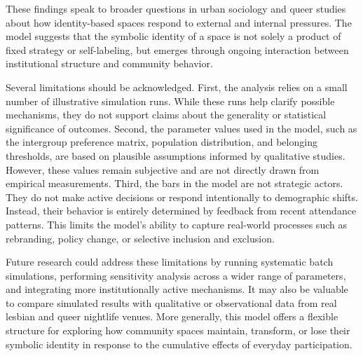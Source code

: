 \documentclass{article}
\begin{document}
These findings speak to broader questions in urban sociology and queer studies about how identity-based spaces respond to external and internal pressures. The model suggests that the symbolic identity of a space is not solely a product of fixed strategy or self-labeling, but emerges through ongoing interaction between institutional structure and community behavior.

Several limitations should be acknowledged. First, the analysis relies on a small number of illustrative simulation runs. While these runs help clarify possible mechanisms, they do not support claims about the generality or statistical significance of outcomes. Second, the parameter values used in the model, such as the intergroup preference matrix, population distribution, and belonging thresholds, are based on plausible assumptions informed by qualitative studies. However, these values remain subjective and are not directly drawn from empirical measurements. Third, the bars in the model are not strategic actors. They do not make active decisions or respond intentionally to demographic shifts. Instead, their behavior is entirely determined by feedback from recent attendance patterns. This limits the model’s ability to capture real-world processes such as rebranding, policy change, or selective inclusion and exclusion.

Future research could address these limitations by running systematic batch simulations, performing sensitivity analysis across a wider range of parameters, and integrating more institutionally active mechanisms. It may also be valuable to compare simulated results with qualitative or observational data from real lesbian and queer nightlife venues. More generally, this model offers a flexible structure for exploring how community spaces maintain, transform, or lose their symbolic identity in response to the cumulative effects of everyday participation.

 
   
\end{document}
